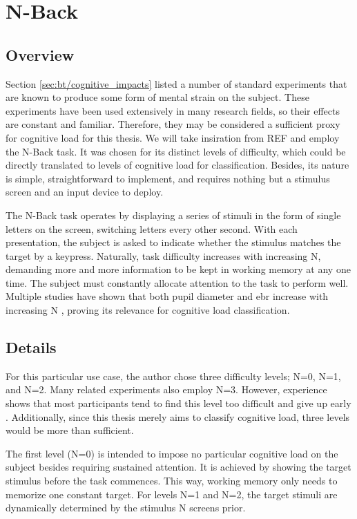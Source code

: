\section{N-Back} \label{sec:impl/tasks}
\subsection{Overview}

Section \ref{sec:bt/cognitive_impacts} listed a number of standard experiments that are known to produce some form of mental strain on the subject. These experiments have been used extensively in many research fields, so their effects are constant and familiar. Therefore, they may be considered a sufficient proxy for cognitive load for this thesis. We will take insiration from REF and employ the N-Back task. It was chosen for its distinct levels of difficulty, which could be directly translated to levels of cognitive load for classification. Besides, its nature is simple, straightforward to implement, and requires nothing but a stimulus screen and an input device to deploy. 

The N-Back task operates by displaying a series of stimuli in the form of single letters on the screen, switching letters every other second. With each presentation, the subject is asked to indicate whether the stimulus matches the target by a keypress. Naturally, task difficulty increases with increasing N, demanding more and more information to be kept in working memory at any one time. The subject must constantly allocate attention to the task to perform well. Multiple studies have shown that both pupil diameter and \acrshort{ebr} increase with increasing N \cite{hopstaken2015, belayachi2015, brouwer2014, niezgoda2015}, proving its relevance for cognitive load classification. 

\subsection{Details}

For this particular use case, the author chose three difficulty levels; N=0, N=1, and N=2. Many related experiments also employ N=3. However, experience shows that most participants tend to find this level too difficult and give up early \cite{ayaz2007, izzetoglu2007}. Additionally, since this thesis merely aims to classify cognitive load, three levels would be more than sufficient.

The first level (N=0) is intended to impose no particular cognitive load on the subject besides requiring sustained attention. It is achieved by showing the target stimulus before the task commences. This way, working memory only needs to memorize one constant target. For levels N=1 and N=2, the target stimuli are dynamically determined by the stimulus N screens prior.

